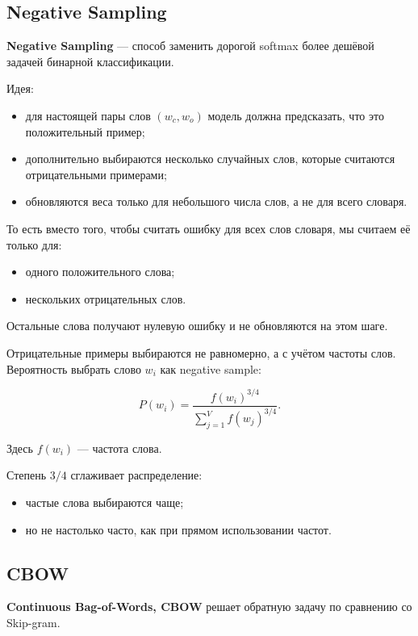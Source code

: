 \documentclass[a4paper,12pt]{article}
\begin{document}
\subsection{Negative Sampling}

\textbf{Negative Sampling} --- способ заменить дорогой softmax более дешёвой задачей бинарной классификации.

Идея:

\begin{itemize}
    \item для настоящей пары слов \((w_c, w_o)\) модель должна предсказать, что это положительный пример;
    \item дополнительно выбираются несколько случайных слов, которые считаются отрицательными примерами;
    \item обновляются веса только для небольшого числа слов, а не для всего словаря.
\end{itemize}

То есть вместо того, чтобы считать ошибку для всех слов словаря, мы считаем её только для:

\begin{itemize}
    \item одного положительного слова;
    \item нескольких отрицательных слов.
\end{itemize}

Остальные слова получают нулевую ошибку и не обновляются на этом шаге.

Отрицательные примеры выбираются не равномерно, а с учётом частоты слов. Вероятность выбрать слово \(w_i\) как negative sample:

\[
P(w_i)
=
\frac{f(w_i)^{3/4}}
{\sum_{j=1}^{V} f(w_j)^{3/4}}.
\]

Здесь \(f(w_i)\) --- частота слова.

Степень \(3/4\) сглаживает распределение:

\begin{itemize}
    \item частые слова выбираются чаще;
    \item но не настолько часто, как при прямом использовании частот.
\end{itemize}

\subsection{CBOW}

\textbf{Continuous Bag-of-Words, CBOW} решает обратную задачу по сравнению со Skip-gram.
\end{document}
